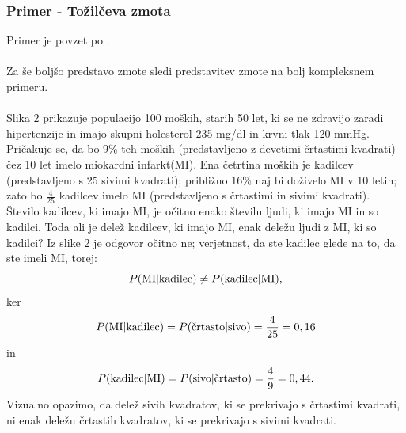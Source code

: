 \documentclass[fin1, tisk]{fmfdelo}
\theoremstyle{definition}
\theoremstyle{trditev}
\theoremstyle{izrek}
\begin{document}
\subsubsection{Primer - Tožilčeva zmota}
Primer je povzet po \cite{iliinski}.\\\\
Za še boljšo predstavo zmote sledi predstavitev zmote na bolj kompleksnem primeru.\\\\
Slika 2 prikazuje populacijo 100 moških, starih 50 let, ki se ne zdravijo zaradi hipertenzije in imajo skupni holesterol 235 mg/dl in krvni tlak 120 mmHg. Pričakuje
se, da bo 9\% teh moških (predstavljeno z devetimi črtastimi kvadrati) čez 10 let imelo miokardni infarkt(MI). Ena četrtina moških je kadilcev (predstavljeno s 25
sivimi kvadrati); približno 16\% naj bi doživelo MI v 10 letih; zato bo $\frac{4}{25}$ kadilcev imelo MI (predstavljeno s črtastimi in sivimi kvadrati). \\
Število kadilcev, ki imajo MI, je očitno enako številu ljudi, ki imajo MI in so kadilci. Toda ali je delež kadilcev, ki imajo MI, enak deležu ljudi z MI, ki so kadilci? Iz
slike 2 je odgovor očitno ne; verjetnost, da ste kadilec glede na to, da ste imeli MI, torej:
\[
   P(\text{MI} \lvert \text{kadilec}) \ne P(\text{kadilec} \lvert \text{MI}), \vspace{2mm}
\]
ker
\[
   P(\text{MI} \lvert \text{kadilec}) = P(\text{črtasto} \lvert \text{sivo}) = \frac{4}{25} = 0,16 \vspace{2mm}
\]
in
\[
   P(\text{kadilec} \lvert \text{MI}) = P(\text{sivo} \lvert \text{črtasto}) = \frac{4}{9} = 0,44. \vspace{2mm}
\]
Vizualno opazimo, da delež sivih kvadratov, ki se prekrivajo s črtastimi kvadrati, ni enak deležu črtastih kvadratov, ki se prekrivajo s sivimi kvadrati.
\end{document}
